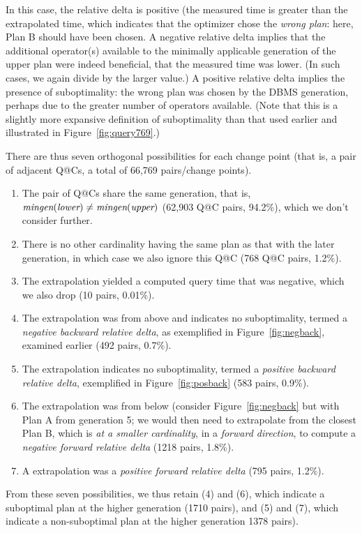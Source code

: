 \documentclass[prodmode,acmtods]{acmsmall}
\begin{document}
In this case, the relative delta is positive (the measured time is greater
than the extrapolated time, which indicates that the optimizer chose the
{\em wrong plan}: here, Plan B should have been chosen.  A negative
relative delta implies that the additional operator(s) available to the
minimally applicable generation of the upper plan were indeed beneficial,
that the measured time was lower. (In such cases, we again divide by the
larger value.)  A
positive relative delta implies the presence of suboptimality: the wrong
plan was chosen by the \hbox{DBMS} generation, perhaps due to the greater number of
operators available. (Note that this is a slightly more expansive definition
of suboptimality than that used earlier and illustrated in
Figure~\ref{fig:query769}.)

There are thus seven orthogonal possibilities for each change point (that
is, a pair of adjacent Q@Cs, a total of 66,769 pairs/change points).

\begin{enumerate}
\item The pair of Q@Cs share the same generation, that is, 
$\hbox{\em mingen}(\hbox{\em lower}) \neq
\hbox{\em mingen}(\hbox{\em upper})$ (62,903 Q@C pairs, 94.2\%), which we don't consider further.

\item There is no other cardinality having the same plan as that with the
later generation, in which case we also ignore this Q@C (768 Q@C pairs,
1.2\%).

\item The extrapolation yielded a computed query
time that was negative, which we also drop (10 pairs, 0.01\%).

\item The extrapolation was from above and indicates
no suboptimality, termed a {\em negative backward relative delta}, as
  exemplified in Figure~\ref{fig:negback}, examined earlier (492 pairs,
  0.7\%).

\item The extrapolation indicates no suboptimality, termed a {\em positive backward
    relative delta}, exemplified in Figure~\ref{fig:posback} (583 pairs,
  0.9\%).

\item The extrapolation was from below (consider Figure~\ref{fig:negback} but with
  Plan A from generation 5; we would then need to extrapolate from the
  closest Plan B, which is {\em at a smaller cardinality}, in a {\em forward
    direction}, to compute a {\em negative forward relative delta} (1218
  pairs, 1.8\%).

\item A extrapolation was a {\em positive forward relative delta} (795 pairs, 1.2\%).
\end{enumerate}
From these seven possibilities, we thus retain (4) and (6), which indicate a
suboptimal plan at the higher generation (1710 pairs), and (5) and (7), which indicate a
non-suboptimal plan at the higher generation 1378 pairs).
\end{document}
